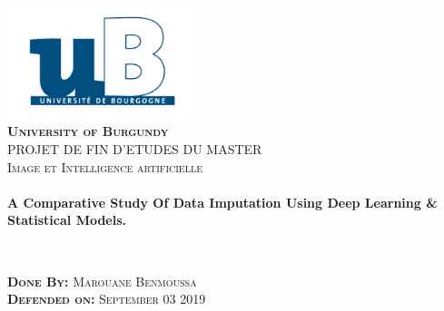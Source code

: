 \documentclass[11pt]{report}           %
\begin{document}
\begin{titlepage}
\begin{center}

\includegraphics[width=0.4\textwidth]{img/logoUniv}~\\[1cm]

\textsc{\LARGE \bfseries University of Burgundy }\\[1.1cm]


\textsc{\Large PROJET DE FIN D’ETUDES DU MASTER}\\[0.3cm]
\textsc{\Large Image et Intelligence artificielle }\\[0.4cm]
\HRule \\[0.1cm]

{\huge \bfseries A Comparative Study Of Data Imputation Using Deep Learning \& Statistical Models.\\[0.8cm]}

\HRule \\[0.1cm]

\vspace{0.4cm}

\textsc{\bfseries Done By:}%
\textsc{\large Marouane Benmoussa}\\[0.2cm]

\textsc{\Large \bfseries Defended on:}%
\textsc{\large September 03  2019}\\[0.1cm]
%
\vfill
\end{center}


\end{titlepage}
\end{document}
